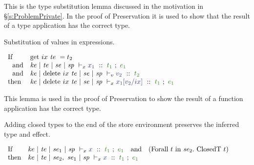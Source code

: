 \smallskip\noindent
This is the type substitution lemma discussed in the motivation in \S\ref{s:ProblemPrivate}. In the proof of Preservation it is used to show that the result of a type application has the correct type.
\qqed

\eject
\begin{lemma}
Substitution of values in expressions.
\end{lemma}

$
\begin{array}{ll}
    \pIf        & \trm{get}~ ix~ \mte~ = t_2
\\  ~~\pand     & \TypeX{\mke}{\mte}{\mse}{\msp}
                        {x_1}{t_1}{e_1}
\\  ~~\pand     & \TypeV{\mke}
                        {\trm{delete}~ ix~ \mte}
                        {\mse}
                        {\msp}
                        {v_2}
                        {t_2}
\\  \pthen      & \TypeX{\mke}
                        {\trm{delete}~ ix~ \mte}
                        {\mse}
                        {\msp}
                        {x_1[v_2/ix]}
                        {t_1}
                        {e_1}
\end{array}
$

\smallskip\noindent
This lemma is used in the proof of Preservation to show the result of a function application has the correct type.
\qqed


\begin{lemma}
Adding closed types to the end of the store environment preserves the inferred type and effect.
\end{lemma}

$
\begin{array}{ll}
    \pIf        & \TypeX{\mke}{\mte}{\mse_1}{\msp}
                        {x}
                        {t_1}
                        {e_1}
 ~~~\pand~~~ (\pForall~ t ~\pin~ \mse_2.~ \trm{ClosedT}~ t)
\\  \pthen      & \TypeX{\mke}{\mte}{\mse_2,~ \mse_1}{\msp}
                        {x}
                        {t_1}
                        {e_1}
\end{array}
$

